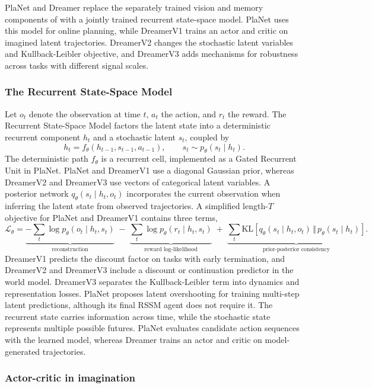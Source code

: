 PlaNet and Dreamer replace the separately trained vision and memory components of \citet{HaSchmidhuber2018} with a jointly trained recurrent state-space model. PlaNet uses this model for online planning, while DreamerV1 trains an actor and critic on imagined latent trajectories. DreamerV2 changes the stochastic latent variables and Kullback-Leibler objective, and DreamerV3 adds mechanisms for robustness across tasks with different signal scales.

\subsubsection{The Recurrent State-Space Model}
\label{section:fc_rssm_transition}

Let $o_t$ denote the observation at time $t$, $a_t$ the action, and $r_t$ the reward. The Recurrent State-Space Model factors the latent state into a deterministic recurrent component $h_t$ and a stochastic latent $s_t$, coupled by
\[ h_t = f_\theta(h_{t-1}, s_{t-1}, a_{t-1}), \qquad s_t \sim p_\theta(s_t \mid h_t). \]
The deterministic path $f_\theta$ is a recurrent cell, implemented as a Gated Recurrent Unit in PlaNet. PlaNet and DreamerV1 use a diagonal Gaussian prior, whereas DreamerV2 and DreamerV3 use vectors of categorical latent variables. A posterior network $q_\theta(s_t \mid h_t, o_t)$ incorporates the current observation when inferring the latent state from observed trajectories. A simplified length-$T$ objective for PlaNet and DreamerV1 contains three terms,
\[ \mathcal{L}_\theta = \underbrace{-\sum_t \log p_\theta(o_t \mid h_t, s_t)}_{\text{reconstruction}} \;-\; \underbrace{\sum_t \log p_\theta(r_t \mid h_t, s_t)}_{\text{reward log-likelihood}} \;+\; \underbrace{\sum_t \mathrm{KL}\!\left[ q_\theta(s_t \mid h_t, o_t) \,\Vert\, p_\theta(s_t \mid h_t) \right]}_{\text{prior-posterior consistency}}. \]
DreamerV1 predicts the discount factor on tasks with early termination, and DreamerV2 and DreamerV3 include a discount or continuation predictor in the world model. DreamerV3 separates the Kullback-Leibler term into dynamics and representation losses. PlaNet proposes latent overshooting for training multi-step latent predictions, although its final RSSM agent does not require it. The recurrent state carries information across time, while the stochastic state represents multiple possible futures. PlaNet evaluates candidate action sequences with the learned model, whereas Dreamer trains an actor and critic on model-generated trajectories.

\subsubsection{Actor-critic in imagination}
\label{section:fc_rssm_imagination}


